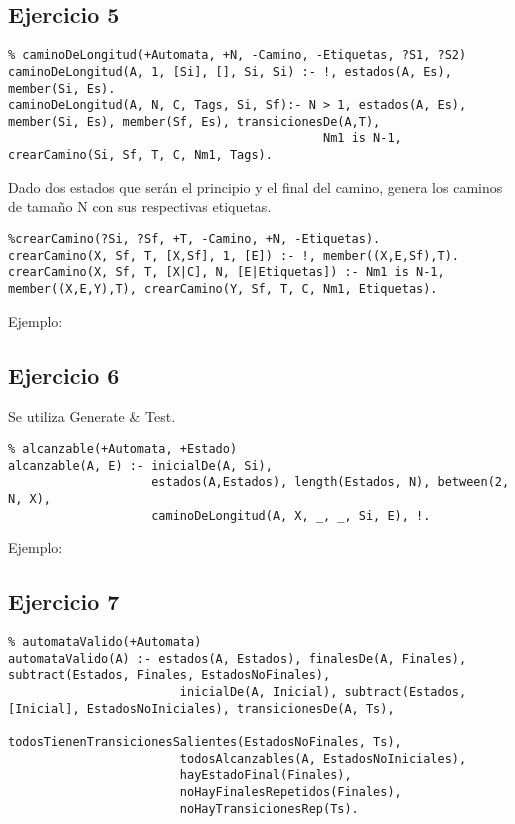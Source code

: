 \documentclass[10pt, a4paper,english,spanish,hidelinks]{article}
\begin{document}
\subsection{Ejercicio 5}

\begin{verbatim}
% caminoDeLongitud(+Automata, +N, -Camino, -Etiquetas, ?S1, ?S2)
caminoDeLongitud(A, 1, [Si], [], Si, Si) :- !, estados(A, Es), member(Si, Es). 			
caminoDeLongitud(A, N, C, Tags, Si, Sf):- N > 1, estados(A, Es), member(Si, Es), member(Sf, Es), transicionesDe(A,T), 
											Nm1 is N-1, crearCamino(Si, Sf, T, C, Nm1, Tags).

\end{verbatim}


Dado dos estados que serán el principio y el final del camino, genera los caminos de
tamaño N con sus respectivas etiquetas. 

\begin{verbatim}
%crearCamino(?Si, ?Sf, +T, -Camino, +N, -Etiquetas).
crearCamino(X, Sf, T, [X,Sf], 1, [E]) :- !, member((X,E,Sf),T).
crearCamino(X, Sf, T, [X|C], N, [E|Etiquetas]) :- Nm1 is N-1, member((X,E,Y),T), crearCamino(Y, Sf, T, C, Nm1, Etiquetas). 
\end{verbatim}

Ejemplo:

\subsection{Ejercicio 6}
Se utiliza Generate & Test.
\begin{verbatim}
% alcanzable(+Automata, +Estado)
alcanzable(A, E) :- inicialDe(A, Si), 
					estados(A,Estados),	length(Estados, N), between(2, N, X),
					caminoDeLongitud(A, X, _, _, Si, E), !.

\end{verbatim}

Ejemplo:


\subsection{Ejercicio 7}
\begin{verbatim}
% automataValido(+Automata)
automataValido(A) :- estados(A, Estados), finalesDe(A, Finales), subtract(Estados, Finales, EstadosNoFinales), 
						inicialDe(A, Inicial), subtract(Estados, [Inicial], EstadosNoIniciales), transicionesDe(A, Ts),
						todosTienenTransicionesSalientes(EstadosNoFinales, Ts), 
						todosAlcanzables(A, EstadosNoIniciales), 
						hayEstadoFinal(Finales), 
						noHayFinalesRepetidos(Finales),
						noHayTransicionesRep(Ts).
\end{verbatim}
						
\end{document}
